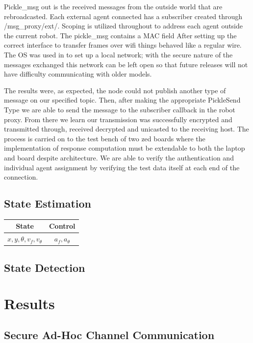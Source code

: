 \documentclass[conference]{IEEEtran}
\begin{document}
Pickle\_msg out is the received messages from the outside world that are rebroadcasted. Each external agent connected has a subscriber created through /msg\_proxy/ext/. Scoping is utilized throughout to address each agent outside the current robot. The pickle\_msg contains a MAC field After setting up the correct interface to transfer frames over wifi things behaved like a regular wire. The OS was used in to set up a local network; with the secure nature of the messages exchanged this network can be left open so that future releases will not have difficulty communicating with older models. 

The results were, as expected, the node could not publish another type of message on our specified topic. Then, after making the appropriate PickleSend Type we are able to send the message to the subscriber callback in the robot proxy. From there we learn our transmission was successfully encrypted and transmitted through, received decrypted and unicasted to the receiving host. The process is carried on to the test bench of two zed boards where the implementation of response computation must be extendable to both the laptop and board despite architecture. We are able to verify the authentication and individual agent assignment by verifying the test data itself at each end of the connection.

\subsection{State Estimation}

\begin{table}[] \label{st_ctr_table}
\begin{center}
\begin{tabular}{|c|c|}
\hline
State & Control\\
\hline
$x,y,\theta,v_f,v_\theta$ & $a_f,a_\theta$\\
\hline
\end{tabular}
\end{center}
\end{table}

\subsection{State Detection}


\section{Results} \label{Results}
\subsection{Secure Ad-Hoc Channel Communication}
\end{document}
